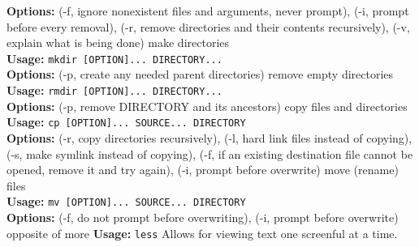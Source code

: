 \documentclass[number]{notes}
\begin{document}
\begin{landscape}
\begin{multicols}{3}
\textbf{Options:} (-f, ignore nonexistent files and arguments, never prompt), (-i, prompt before every removal), (-r, remove directories and their contents recursively), (-v, explain what is being done)
make directories\\
\textbf{Usage:} \texttt{mkdir [OPTION]... DIRECTORY...}\\
\textbf{Options:} (-p, create any needed parent directories)
remove empty directories\\
\textbf{Usage:} \texttt{rmdir [OPTION]... DIRECTORY...}\\
\textbf{Options:} (-p, remove DIRECTORY and its ancestors)
copy files and directories\\
\textbf{Usage:} \texttt{cp [OPTION]... SOURCE... DIRECTORY}\\
\textbf{Options:} (-r, copy directories recursively), (-l, hard link files instead of copying), (-s, make symlink instead of copying), (-f, if an existing destination file cannot be opened, remove it and try again), (-i, prompt before overwrite)
move (rename) files\\
\textbf{Usage:} \texttt{mv [OPTION]... SOURCE... DIRECTORY}\\
\textbf{Options:} (-f, do not prompt before overwriting), (-i, prompt before overwrite)
opposite of more
\textbf{Usage:} \texttt{less}
Allows for viewing text one screenful at a time.

\end{multicols}
\end{landscape}
\end{document}
